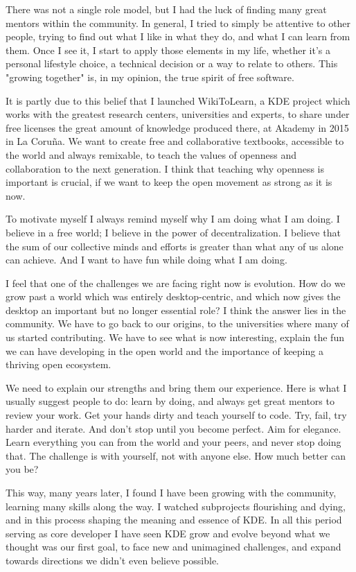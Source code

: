 There was not a single role model, but I had the luck of finding many great mentors within the community. In general, I tried to simply be attentive to other people, trying to find out what I like in what they do, and what I can learn from them. Once I see it, I start to apply those elements in my life, whether it's a personal lifestyle choice, a technical decision or a way to relate to others. This "growing together" is, in my opinion, the true spirit of free software.

It is partly due to this belief that I launched WikiToLearn, a KDE project which works with the greatest research centers, universities and experts, to share under free licenses the great amount of knowledge produced there, at Akademy in 2015 in La Coru\~{n}a. We want to create free and collaborative textbooks, accessible to the world and always remixable, to teach the values of openness and collaboration to the next generation. I think that teaching why openness is important is crucial, if we want to keep the open movement as strong as it is now.

To motivate myself I always remind myself why I am doing what I am doing. I believe in a free world; I believe in the power of decentralization. I believe that the sum of our collective minds and efforts is greater than what any of us alone can achieve. And I want to have fun while doing what I am doing.

I feel that one of the challenges we are facing right now is evolution. How do we grow past a world which was entirely desktop-centric, and which now gives the desktop an important but no longer essential role? I think the answer lies in the community. We have to go back to our origins, to the universities where many of us started contributing. We have to see what is now interesting, explain the fun we can have developing in the open world and the importance of keeping a thriving open ecosystem.

We need to explain our strengths and bring them our experience. Here is what I usually suggest people to do: learn by doing, and always get great mentors to review your work. Get your hands dirty and teach yourself to code. Try, fail, try harder and iterate. And don't stop until you become perfect. Aim for elegance. Learn everything you can from the world and your peers, and never stop doing that. The challenge is with yourself, not with anyone else. How much better can you be?

This way, many years later, I found I have been growing with the community, learning many skills along the way. I watched subprojects flourishing and dying, and in this process shaping the meaning and essence of KDE. In all this period serving as core developer I have seen KDE grow and evolve beyond what we thought was our first goal, to face new and unimagined challenges, and expand towards directions we didn't even believe possible.

